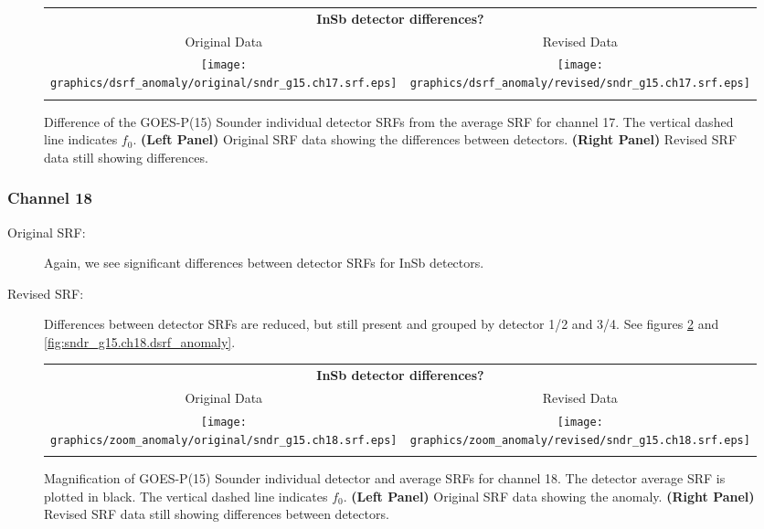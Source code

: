 \begin{figure}[htp]
  \centering
  \begin{tabular}{c c}
    \multicolumn{2}{c}{\textsf{\bfseries InSb detector differences?}} \\
    \hspace{1.5em}\textsf{Original Data} &
    \hspace{1.5em}\textsf{Revised Data} \\
    \texttt{[image: graphics/dsrf\_anomaly/original/sndr\_g15.ch17.srf.eps]} &
    \texttt{[image: graphics/dsrf\_anomaly/revised/sndr\_g15.ch17.srf.eps]} \\\\
  \end{tabular}
  \caption{Difference of the GOES-P(15) Sounder individual detector SRFs from the average SRF for channel 17. The vertical dashed line indicates $f_0$. \textbf{(Left Panel)} Original SRF data showing the differences between detectors. \textbf{(Right Panel)} Revised SRF data still showing differences.}
  \label{fig:sndr_g15.ch17.dsrf_anomaly}
\end{figure}

\subsubsection{Channel 18}
\begin{description}
  \item[Original SRF:] Again, we see significant differences between detector SRFs for InSb detectors.
  \item[Revised SRF:]  Differences between detector SRFs are reduced, but still present and grouped by detector 1/2 and 3/4. See figures \ref{fig:sndr_g15.ch18.anomaly} and \ref{fig:sndr_g15.ch18.dsrf_anomaly}.
\end{description}

\begin{figure}[htp]
  \centering
  \begin{tabular}{c c}
    \multicolumn{2}{c}{\textsf{\bfseries InSb detector differences?}} \\
    \hspace{1.5em}\textsf{Original Data} &
    \hspace{1.5em}\textsf{Revised Data} \\
    \texttt{[image: graphics/zoom\_anomaly/original/sndr\_g15.ch18.srf.eps]} &
    \texttt{[image: graphics/zoom\_anomaly/revised/sndr\_g15.ch18.srf.eps]} \\\\
  \end{tabular}
  \caption{Magnification of GOES-P(15) Sounder individual detector and average SRFs for channel 18. The detector average SRF is plotted in black. The vertical dashed line indicates $f_0$. \textbf{(Left Panel)} Original SRF data showing the anomaly. \textbf{(Right Panel)} Revised SRF data still showing differences between detectors.}
  \label{fig:sndr_g15.ch18.anomaly}
\end{figure}


